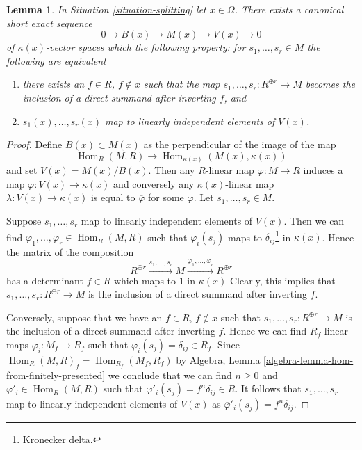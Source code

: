 \documentclass[10pt,a4paper]{amsart}
\theoremstyle{plain}
\newtheorem{lemma}[subsection]{Lemma}
\theoremstyle{definition}
\theoremstyle{remark}
\numberwithin{equation}{subsection}
\def\Hom{\mathop{\mathrm{Hom}}\nolimits}
\begin{document}
\begin{lemma}
\label{lemma-which-elements-split}
In Situation \ref{situation-splitting} let $x \in \Omega$. There exists a
canonical short exact sequence
$$
0 \to B(x) \to M(x) \to V(x) \to 0
$$
of $\kappa(x)$-vector spaces which the following
property: for $s_1, \ldots, s_r \in M$ the following are equivalent
\begin{enumerate}
\item there exists an $f \in R$, $f \not \in x$ such that
the map $s_1, \ldots, s_r : R^{\oplus r} \to M$ becomes the
inclusion of a direct summand after inverting $f$, and
\item $s_1(x), \ldots, s_r(x)$ map to linearly independent
elements of $V(x)$.
\end{enumerate}
\end{lemma}

\begin{proof}
Define $B(x) \subset M(x)$ as the perpendicular of the image of the map
$$
\Hom_R(M, R) \to \Hom_{\kappa(x)}(M(x), \kappa(x))
$$
and set $V(x) = M(x)/B(x)$. Then any $R$-linear map $\varphi : M \to R$
induces a map $\overline{\varphi} : V(x) \to \kappa(x)$ and conversely
any $\kappa(x)$-linear map $\lambda : V(x) \to \kappa(x)$ is equal
to $\overline{\varphi}$ for some $\varphi$. Let $s_1, \ldots, s_r \in M$.

\medskip\noindent
Suppose $s_1, \ldots, s_r$ map to linearly independent elements of
$V(x)$. Then we can find $\varphi_1, \ldots, \varphi_r \in \Hom_R(M, R)$
such that $\varphi_i(s_j)$ maps to $\delta_{ij}$\footnote{Kronecker delta.}
in $\kappa(x)$. Hence the matrix of the composition
$$
R^{\oplus r}
\xrightarrow{s_1, \ldots, s_r}
M
\xrightarrow{\varphi_1, \ldots, \varphi_r}
R^{\oplus r}
$$
has a determinant $f \in R$ which maps to $1$ in $\kappa(x)$
Clearly, this implies that $s_1, \ldots, s_r : R^{\oplus r} \to M$
is the inclusion of a direct summand after inverting $f$.

\medskip\noindent
Conversely, suppose that we have an $f \in R$, $f \not \in x$
such that $s_1, \ldots, s_r : R^{\oplus r} \to M$
is the inclusion of a direct summand after inverting $f$.
Hence we can find $R_f$-linear maps $\varphi_i : M_f \to R_f$
such that $\varphi_i(s_j) = \delta_{ij} \in R_f$.
Since $\Hom_R(M, R)_f = \Hom_{R_f}(M_f, R_f)$ by
Algebra, Lemma \ref{algebra-lemma-hom-from-finitely-presented}
we conclude that we can find $n \geq 0$ and $\varphi'_i \in \Hom_R(M, R)$
such that $\varphi'_i(s_j) = f^n\delta_{ij} \in R$.
It follows that $s_1, \ldots, s_r$ map to linearly independent
elements of $V(x)$ as $\overline{\varphi}'_i(s_j) = f^n\delta_{ij}$.
\end{proof}
\end{document}
